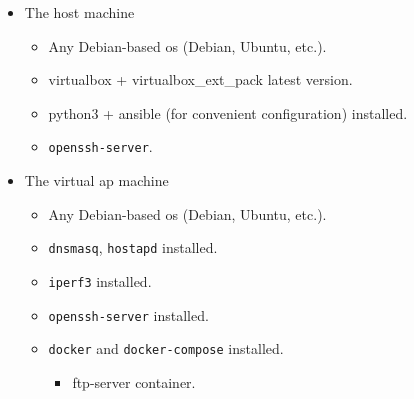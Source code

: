 \begin{itemize}
\tightlist
\item
The host machine

\begin{itemize}
	\tightlist
	\item
	Any Debian-based \acrshort{os} (Debian, Ubuntu, etc.).
	\item
	\gls{virtualbox} + \gls{virtualbox_ext_pack} latest version.
	\item
	\gls{python3} + \gls{ansible} (for convenient configuration) installed.
	\item
	\texttt{openssh-server}.
\end{itemize}
\item
  The virtual \acrshort{ap} machine

  \begin{itemize}
  \tightlist
  \item
    Any Debian-based \acrshort{os} (Debian, Ubuntu, etc.).
  \item
    \texttt{dnsmasq}, \texttt{hostapd} installed.
  \item
    \texttt{iperf3} installed.
  \item
    \texttt{openssh-server} installed.
  \item
    \texttt{docker} and \texttt{docker-compose} installed.

    \begin{itemize}
    \tightlist
    \item
      \acrshort{ftp}-server container.
    \end{itemize}
  \end{itemize}
\end{itemize}
